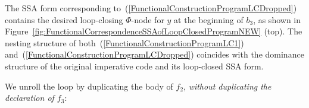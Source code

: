 The SSA form corresponding
to~(\ref{FunctionalConstructionProgramLCDropped}) contains the desired
loop-closing $\Phi$-node for $y$ at the beginning of $b_3$, as shown
in Figure~\ref{fig:FunctionalCorrespondenceSSAofLoopClosedProgramNEW}
(top). The nesting structure of
both~(\ref{FunctionalConstructionProgramLC1})
and~(\ref{FunctionalConstructionProgramLCDropped}) coincides with the
dominance structure of the original imperative code and its
loop-closed SSA form.

We unroll the loop by duplicating the body of $f_2$, \emph{without
duplicating the declaration of $f_3$}:
